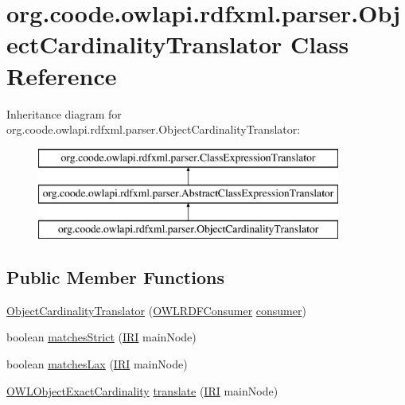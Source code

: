 \hypertarget{classorg_1_1coode_1_1owlapi_1_1rdfxml_1_1parser_1_1_object_cardinality_translator}{\section{org.\-coode.\-owlapi.\-rdfxml.\-parser.\-Object\-Cardinality\-Translator Class Reference}
\label{classorg_1_1coode_1_1owlapi_1_1rdfxml_1_1parser_1_1_object_cardinality_translator}
}
Inheritance diagram for org.\-coode.\-owlapi.\-rdfxml.\-parser.\-Object\-Cardinality\-Translator\-:\begin{figure}[H]
\begin{center}
\leavevmode
\includegraphics[height=3.000000cm]{classorg_1_1coode_1_1owlapi_1_1rdfxml_1_1parser_1_1_object_cardinality_translator}
\end{center}
\end{figure}
\subsection*{Public Member Functions}
\begin{DoxyCompactItemize}
\item 
\hyperlink{classorg_1_1coode_1_1owlapi_1_1rdfxml_1_1parser_1_1_object_cardinality_translator_af1c65de190338db877894a814e6a7762}{Object\-Cardinality\-Translator} (\hyperlink{classorg_1_1coode_1_1owlapi_1_1rdfxml_1_1parser_1_1_o_w_l_r_d_f_consumer}{O\-W\-L\-R\-D\-F\-Consumer} \hyperlink{classorg_1_1coode_1_1owlapi_1_1rdfxml_1_1parser_1_1_abstract_class_expression_translator_ae547084cdd5b92c03835b5aa404f823b}{consumer})
\item 
boolean \hyperlink{classorg_1_1coode_1_1owlapi_1_1rdfxml_1_1parser_1_1_object_cardinality_translator_a3b867eaf0ba6560a507c2ba40be1abdd}{matches\-Strict} (\hyperlink{classorg_1_1semanticweb_1_1owlapi_1_1model_1_1_i_r_i}{I\-R\-I} main\-Node)
\item 
boolean \hyperlink{classorg_1_1coode_1_1owlapi_1_1rdfxml_1_1parser_1_1_object_cardinality_translator_a7799c797ffba6cd2c911c4e0cbeb1e81}{matches\-Lax} (\hyperlink{classorg_1_1semanticweb_1_1owlapi_1_1model_1_1_i_r_i}{I\-R\-I} main\-Node)
\item 
\hyperlink{interfaceorg_1_1semanticweb_1_1owlapi_1_1model_1_1_o_w_l_object_exact_cardinality}{O\-W\-L\-Object\-Exact\-Cardinality} \hyperlink{classorg_1_1coode_1_1owlapi_1_1rdfxml_1_1parser_1_1_object_cardinality_translator_ab91febf9a10f45a39d9b19c05f462c0c}{translate} (\hyperlink{classorg_1_1semanticweb_1_1owlapi_1_1model_1_1_i_r_i}{I\-R\-I} main\-Node)
\end{DoxyCompactItemize}

